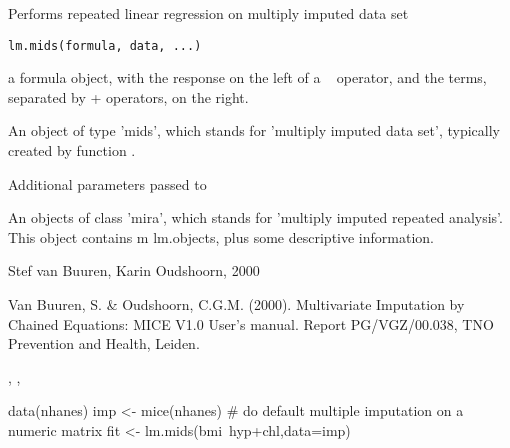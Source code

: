 \documentclass{article}
\begin{document}
\begin{Description}\relax
Performs repeated linear regression on multiply imputed data set
\end{Description}
\begin{Usage}
\begin{verbatim}
lm.mids(formula, data, ...)
\end{verbatim}
\end{Usage}
\begin{Arguments}
\begin{ldescription}
\item[\code{formula}] a formula object, with the response on the left of a ~ operator, and the 
terms, separated by + operators, on the right.
\item[\code{data}] An object of type 'mids', which stands for 'multiply imputed data set', typically
created by function .
\item[\code{...}] Additional parameters passed to 
\end{ldescription}
\end{Arguments}
\begin{Value}
An objects of class 'mira', which stands for 'multiply imputed repeated analysis'.
This object contains m lm.objects, plus some descriptive information.
\end{Value}
\begin{Author}\relax
Stef van Buuren, Karin Oudshoorn, 2000
\end{Author}
\begin{References}\relax
Van Buuren, S. \& Oudshoorn, C.G.M. (2000). Multivariate Imputation by Chained Equations: 
MICE V1.0 User's manual. Report PG/VGZ/00.038, TNO Prevention and Health, Leiden.
\end{References}
\begin{SeeAlso}\relax
{}, , 
\end{SeeAlso}
\begin{Examples}
\begin{ExampleCode}
data(nhanes)
imp <- mice(nhanes)     # do default multiple imputation on a numeric matrix
fit <- lm.mids(bmi~hyp+chl,data=imp)
\end{ExampleCode}
\end{Examples}
\end{document}

